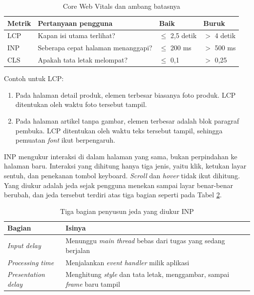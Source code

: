 \begin{table}[!htb]
  \centering
  \caption{Core Web Vitals dan ambang batasnya}
  \label{tab:cwv}
  \begin{tabularx}{\textwidth}{lXll}
    \hline
    \textbf{Metrik} & \textbf{Pertanyaan pengguna} & \textbf{Baik} & \textbf{Buruk} \\
    \hline
    LCP & Kapan isi utama terlihat?      & $\leq$ 2,5 detik & $>$ 4 detik \\
    \hline
    INP & Seberapa cepat halaman menanggapi? & $\leq$ 200 ms & $>$ 500 ms \\
    \hline
    CLS & Apakah tata letak melompat?    & $\leq$ 0,1 & $>$ 0,25 \\
    \hline
  \end{tabularx}
\end{table}

Contoh untuk LCP:

\begin{enumerate}
  \item Pada halaman detail produk, elemen terbesar biasanya foto produk. LCP
        ditentukan oleh waktu foto tersebut tampil.
  \item Pada halaman artikel tanpa gambar, elemen terbesar adalah blok
        paragraf pembuka. LCP ditentukan oleh waktu teks tersebut tampil,
        sehingga pemuatan \textit{font} ikut berpengaruh.
\end{enumerate}

INP mengukur interaksi di dalam halaman yang sama, bukan perpindahan ke halaman
baru. Interaksi yang dihitung hanya tiga jenis, yaitu klik, ketukan layar
sentuh, dan penekanan tombol keyboard. \textit{Scroll} dan \textit{hover} tidak
ikut dihitung. Yang diukur adalah jeda sejak pengguna menekan sampai layar
benar-benar berubah, dan jeda tersebut terdiri atas tiga bagian seperti pada
Tabel \ref{tab:inp}.

\begin{table}[!htb]
  \centering
  \caption{Tiga bagian penyusun jeda yang diukur INP}
  \label{tab:inp}
  \begin{tabularx}{\textwidth}{lX}
    \hline
    \textbf{Bagian} & \textbf{Isinya} \\
    \hline
    \textit{Input delay} & Menunggu \textit{main thread} bebas dari tugas yang sedang berjalan \\
    \hline
    \textit{Processing time} & Menjalankan \textit{event handler} milik aplikasi \\
    \hline
    \textit{Presentation delay} & Menghitung \textit{style} dan tata letak, menggambar, sampai \textit{frame} baru tampil \\
    \hline
  \end{tabularx}
\end{table}

